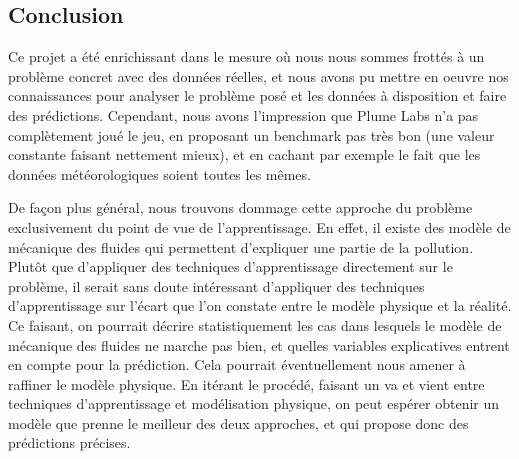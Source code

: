 \subsection{Conclusion}

Ce projet a été enrichissant dans le mesure où nous nous sommes frottés à un problème concret avec des données réelles, et nous avons pu mettre en oeuvre nos connaissances pour analyser le problème posé et les données à disposition et faire des prédictions.
Cependant, nous avons l'impression que Plume Labs n'a pas complètement joué le jeu, en proposant un benchmark pas très bon (une valeur constante faisant nettement mieux), et en cachant par exemple le fait que les données météorologiques soient toutes les mêmes.

De façon plus général, nous trouvons dommage cette approche du problème exclusivement du point de vue de l'apprentissage.
En effet, il existe des modèle de mécanique des fluides qui permettent d'expliquer une partie de la pollution.
Plutôt que d'appliquer des techniques d'apprentissage directement sur le problème, il serait sans doute intéressant d'appliquer des techniques d'apprentissage sur l'écart que l'on constate entre le modèle physique et la réalité.
Ce faisant, on pourrait décrire statistiquement les cas dans lesquels le modèle de mécanique des fluides ne marche pas bien, et quelles variables explicatives entrent en compte pour la prédiction.
Cela pourrait éventuellement nous amener à raffiner le modèle physique.
En itérant le procédé, faisant un va et vient entre techniques d'apprentissage et modélisation physique, on peut espérer obtenir un modèle que prenne le meilleur des deux approches, et qui propose donc des prédictions précises.

